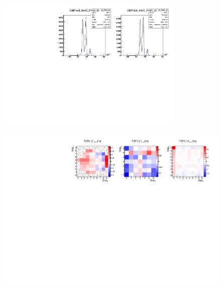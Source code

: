 \begin{figure}
  \begin{center}
  \includegraphics[clip,trim=0 0cm 10cm 0, width=9cm]{04_tof_t0_example} \\
  \caption{}
  \label{fig:tofT0}
  \end{center}
\end{figure}


\begin{figure}
  \begin{center}
  \includegraphics[width=15cm]{05_slab_dt_offset_by_pixel_2d} \\
  \caption{}
  \label{fig:SlabDToffsetByPixel}
  \end{center}
\end{figure}


